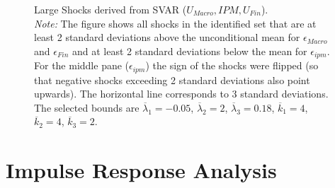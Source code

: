 \documentclass[a4paper,11pt,listof=nochaptergap,oneside,pointednumbers,bibtotoc,bigheadings,liststotoc]{scrbook}
\theoremstyle{mysatz}
\theoremstyle{mydefinition}
\theoremstyle{mybemerkung}
\begin{document}
\begin{figure}[!h]
   \centering
   \setlength\fboxsep{0pt}
   \setlength\fboxrule{0pt}
      \caption[Large Shocks derived from SVAR ($U_{Macro}, IPM, U_{Fin}$).]{Large Shocks derived from SVAR ($U_{Macro}, IPM, U_{Fin}$).\\
      \textit{Note:}  The figure shows all shocks in the identified set that are at least 2 standard deviations above the unconditional mean for $\epsilon_{Macro}$ and $\epsilon_{Fin}$ and at least 2 standard deviations below the mean for $\epsilon_{ipm}$. For the middle pane ($\epsilon_{ipm}$) the sign of the shocks were flipped (so that negative shocks exceeding 2 standard deviations also point upwards). The horizontal line corresponds to 3 standard deviations. The selected bounds are $\overline{\lambda}_1 = -0.05$, $\overline{\lambda}_2 = 2$, $\overline{\lambda}_3 = 0.18$, $\overline{k}_1 = 4$, $\overline{k}_2 = 4$, $\overline{k}_3 = 2$.}   \label{fig:ludvigsonetal_timeseries_e_largeshocks}
\end{figure}




\section[Impulse Response Analysis]{Impulse Response Analysis}
\label{sec:ImpulseResponseAnalysis}
\end{document}
